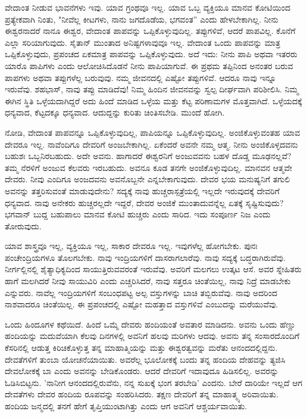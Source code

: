 ವೇದಾಂತ ನೀಡುವ ಭಾವನೆಗಳು ಇವು. ಯಾವ ಗ್ರಂಥವೂ ಇಲ್ಲ. ಯಾವ ಒಬ್ಬ ವ್ಯಕ್ತಿಯೂ ಮಾನವ ಕೋಟಿಯಿಂದ ಪ್ರತ್ಯೇಕವಾಗಿ ನಿಂತು, "ನೀವೆಲ್ಲ ಕೀಟಗಳು, ನಾನು ಜಗದೊಡೆಯ, ಭಗವಂತ'' ಎಂದು ಹೇಳಬೇಕಾಗಿಲ್ಲ. ನೀನು ಈಶ್ವರನಾದರೆ ನಾನೂ ಈಶ್ವರ, ವೇದಾಂತ ಪಾಪವನ್ನು ಒಪ್ಪಿಕೊಳ್ಳುವುದಿಲ್ಲ. ತಪ್ಪುಗಳಿವೆ, ಆದರೆ ಪಾಪವಿಲ್ಲ. ಕೊನೆಗೆ ಎಲ್ಲಾ ಸರಿಯಾಗುವುದು. ಸೈತಾನ್ ಮುಂತಾದ ಅನಿಷ್ಟಗಳಾವುವೂ ಇಲ್ಲ. ವೇದಾಂತ ಒಂದು ಪಾಪವನ್ನು ಮಾತ್ರ ಒಪ್ಪಿಕೊಳ್ಳುವುದು, ಪ್ರಪಂಚದ ಏಕಮಾತ್ರ ಪಾಪವನ್ನು ಒಪ್ಪಿಕೊಳ್ಳುವುದು. ಅದೆ ಇದು: ನೀನು ಪಾಪಿ ಅಥವಾ ಇತರರು ಯಾರೊ ಪಾಪಿಗಳು ಎಂದು ಆಲೋಚಿಸಿದೊಡನೆ ನೀನು ಪಾಪಿಯಾಗುವೆ. ಈ ಪ್ರಥಮ ತಪ್ಪಿನಿಂದ ಅನಂತರ ಬರುವ ಪಾಪಗಳು ಅಥವಾ ತಪ್ಪುಗಳೆಲ್ಲ ಬರುವುವು. ನಮ್ಮ ಜೀವನದಲ್ಲಿ ಎಷ್ಟೋ ತಪ್ಪುಗಳಿವೆ. ಆದರೂ ನಾವು ಇನ್ನೂ ಇರುವೆವು. ಶಹಭಾಸ್, ನಾವು ತಪ್ಪು ಮಾಡಿದೆವು! ನಿಮ್ಮ ಹಿಂದಿನ ಜೀವನವನ್ನು ಸ್ವಲ್ಪ ದೀರ್ಘವಾಗಿ ಪರಿಶೀಲಿಸಿ. ನಿಮ್ಮ ಈಗಿನ ಸ್ಥಿತಿ ಒಳ್ಳೆಯದಾಗಿದ್ದರೆ ಅದು ಹಿಂದೆ ಮಾಡಿದ ಒಳ್ಳೆಯ ಮತ್ತು ಕೆಟ್ಟ ಪರಿಣಾಮಗಳ ಮೊತ್ತವಾಗಿದೆ. ಒಳ್ಳೆಯದಕ್ಕೆ ಧನ್ಯವಾದ, ಕೆಟ್ಟದಕ್ಕೂ ಧನ್ಯವಾದ. ಆದುದ್ದನ್ನು ಕುರಿತು ಚಿಂತಿಸಬೇಡಿ. ಮುಂದೆ ಹೋಗಿ.

ನೋಡಿ, ವೇದಾಂತ ಪಾಪವನ್ನೂ ಒಪ್ಪಿಕೊಳ್ಳುವುದಿಲ್ಲ, ಪಾಪಿಯನ್ನೂ ಒಪ್ಪಿಕೊಳ್ಳುವುದಿಲ್ಲ. ಅಂಜಿಕೊಳ್ಳುವಂತಹ ಯಾವ ದೇವರೂ ಇಲ್ಲ. ನಾವೆಂದಿಗೂ ದೇವರಿಗೆ ಅಂಜಬೇಕಾಗಿಲ್ಲ. ಏಕೆಂದರೆ ಅವನೇ ನಮ್ಮ ಆತ್ಮ. ನೀನು ಅಂಜಿಕೊಳ್ಳದವನು ಬಹುಶಃ ಒಬ್ಬನಿರಬಹುದು. ಅದೇ ಅವನು. ಹಾಗಾದರೆ ಈಶ್ವರನಿಗೆ ಅಂಜುವವನು ಬಹಳ ದೊಡ್ಡ ಮೂಢನಲ್ಲವೆ? ತಮ್ಮ ನೆರಳಿಗೆ ಅಂಜುವ ಕೆಲವರು ಇರಬಹುದು. ಅವನೂ ಕೂಡ ತನಗೇ ಅಂಜಿಕೊಳ್ಳುವುದಿಲ್ಲ. ಮಾನವನ ಆತ್ಮವೇ ದೇವರು. ನೀವು ಎಂದಿಗೂ ಅಂಜದವನು ಅವನೊಬ್ಬನೇ ಎನ್ನಬೇಕಾಗುವುದು. ದೇವರ ಭಯ ಮನುಷ್ಯನಿಗೆ ತಗುಲಿ ಅವನನ್ನು ತತ್ತರಿಸುವಂತೆ ಮಾಡುವುದೇನು? ಸದ್ಯಕ್ಕೆ ನಾವು ಹುಚ್ಚರಾಸ್ಪತ್ರೆಯಲ್ಲಿ ಇಲ್ಲದೇ ಇರುವುದಕ್ಕೆ ದೇವರಿಗೆ ಧನ್ಯವಾದ. ನಾವು ಅನೇಕರು ಹುಚ್ಚರಲ್ಲದೇ ಇದ್ದರೆ, ದೇವರ ಅಂಜಿಕೆ ಮುಂತಾದುವನ್ನೆಲ್ಲ ಏತಕ್ಕೆ ಸೃಷ್ಟಿಸುವುದು? ಭಗವಾನ್ ಬುದ್ದ ಬಹುಪಾಲು ಮಾನವ ಕೋಟಿ ಹುಚ್ಚರು ಎಂದು ಸಾರಿದ. ಇದು ಸಂಪೂರ್ಣ ನಿಜ ಎಂದು ತೋರುವುದು.

ಯಾವ ಶಾಸ್ತ್ರವೂ ಇಲ್ಲ, ವ್ಯಕ್ತಿಯೂ ಇಲ್ಲ, ಸಾಕಾರ ದೇವರೂ ಇಲ್ಲ. ಇವುಗಳೆಲ್ಲ ಹೋಗಬೇಕು. ಪುನಃ ಪಂಚೇಂದ್ರಿಯಗಳೂ ತೊಲಗಬೇಕು. ನಾವು ಇಂದ್ರಿಯಗಳಿಗೆ ದಾಸರಾಗಲಾರೆವು. ನಾವು ಸದ್ಯಕ್ಕೆ ಬದ್ಧರಾಗಿರುವೆವು. ನೀರ್ಗಲ್ಲಿನಲ್ಲಿ ಶೈತ್ಯಾಧಿಕ್ಯದಿಂದ ಸಾಯುತ್ತಿರುವವರಂತೆ ಇರುವೆವು. ಅವರಿಗೆ ಮಲಗಲು ಉತ್ಕಟ ಆಸೆ. ಅವರ ಸ್ನೇಹಿತರು ಹಾಗೆ ಮಲಗಿದರೆ ನೀವು ಸಾಯುವಿರಿ ಎಂದು ಎಚ್ಚರಿಸಿದರೆ, ನಾವು ಸತ್ತರೂ ಚಿಂತೆಯಿಲ್ಲ, ನಾವು ನಿದ್ರೆ ಮಾಡಬೇಕು ಎನ್ನುವರು. ನಾವೆಲ್ಲ ಇಂದ್ರಿಯಗಳಿಗೆ ಸಂಬಂಧಪಟ್ಟ ಅಲ್ಪ ವಸ್ತುಗಳನ್ನು ಬಾಚಿ ತಬ್ಬಿರುವೆವು. ನಾವು ಅದರಿಂದ ನಾಶವಾದರೂ ಚಿಂತೆಯಿಲ್ಲ. ಈ ಪ್ರಪಂಚದಲ್ಲಿ ಎಷ್ಟೋ ಮಹತ್ತಾದ ವಸ್ತುಗಳಿವೆ ಎಂಬುದನ್ನು ಮರೆಯುವೆವು.

ಒಂದು ಹಿಂದೂಗಳ ಕಥೆಯಿದೆ. ಹಿಂದೆ ಒಮ್ಮೆ ದೇವರು ಹಂದಿಯಂತೆ ಅವತಾರ ಮಾಡಿದನು. ಅವನು ಒಂದು ಹೆಣ್ಣು ಹಂದಿಯನ್ನು ಮದುವೆಯಾಗಿ ಕೆಲವು ದಿನಗಳಲ್ಲಿ ಅವನಿಗೆ ಹಲವು ಮರಿಗಳು ಆದವು. ಅವನು ತನ್ನ ಸಂಸಾರದೊಂದಿಗೆ ಕೆಸರಿನಲ್ಲಿ ಆಡುತ್ತ ಕಿರಿಚಿಕೊಳ್ಳುತ್ತ ತನ್ನ ಮಾಹಾತ್ಮಿಯನ್ನು ಮತ್ತು ಈಶ್ವರತ್ವವನ್ನು ಮರೆತು ಆನಂದದಲ್ಲಿದ್ದನು. ದೇವತೆಗಳಿಗೆ ತುಂಬಾ ಯೋಚನೆಯಾಯಿತು. ಅವರೆಲ್ಲ ಭೂಲೋಕಕ್ಕೆ ಬಂದು ತನ್ನ ಹಂದಿಯ ದೇಹವನ್ನು ತ್ಯಜಿಸಿ ದೇವಲೋಕಕ್ಕೆ ಬಾ ಎಂದು ಅವನನ್ನು ಬೇಡಿಕೊಂಡರು. ಆದರೆ ದೇವರಿಗೆ ಇದಾವುದೂ ಹಿಡಿಸಲಿಲ್ಲ. ಅವರನ್ನು ಓಡಿಸಿಬಿಟ್ಟನು. 'ನಾನೀಗ ಆನಂದದಲ್ಲಿರುವೆನು, ನನ್ನ ಸುಖಕ್ಕೆ ಭಂಗ ತರಬೇಡಿ' ಎಂದನು. ಬೇರೆ ದಾರಿಯೇ ಇಲ್ಲದೆ ಆಗ ದೇವತೆಗಳು ದೇವರ ಹಂದಿಯ ರೂಪವನ್ನು ಸಂಹರಿಸಿದರು. ತಕ್ಷಣ ದೇವರಿಗೆ ತನ್ನ ಮಾಹಾತ್ಮ್ಯ ಅರಿವಾಯಿತು. ಹಂದಿಯ ಜನ್ಮದಲ್ಲಿ ತನಗೆ ಹೇಗೆ ತೃಪ್ತಿಯುಂಟಾಗಿತ್ತು ಎಂದು ಆಗ ಅವನಿಗೆ ಆಶ್ಚರ್ಯವಾಯಿತು.

